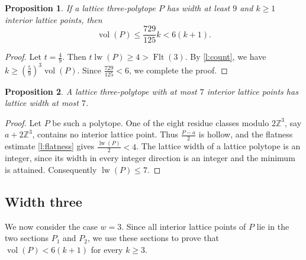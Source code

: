 \documentclass[reqno, 11pt]{article}
\numberwithin{equation}{section}
\newtheorem{proposition}[proposition]{Proposition}
\theoremstyle{definition}
\newcommand{\Z}{\mathbb Z}
\DeclareMathOperator{\vol}{vol}
\DeclareMathOperator{\lw}{lw}
\numberwithin{equation}{section}
\begin{document}
\begin{proposition}\label{l:large}
If a lattice three-polytope $P$ has width at least $9$ and $k\ge1$ interior lattice points, then
\[
 \vol(P)\le\frac{729}{125}k<6(k+1).
\]
\end{proposition}
\begin{proof}
Let $t=\frac{4}{9}$. Then $t\lw(P)\ge4>\operatorname{Flt}(3)$. By \cref{l:count}, we have $k\ge\left(\frac{5}{9}\right)^3\vol(P)$. Since $\frac{729}{125}<6$, we complete the proof.
\end{proof}

\begin{proposition}\label{s:parity}
A lattice three-polytope with at most $7$ interior lattice points has lattice width at most $7$.
\end{proposition}
\begin{proof}
Let \(P\) be such a polytope. One of the eight residue classes modulo $2\Z^3$, say $a+2\Z^3$, contains no interior lattice point. Thus $\frac{P-a}{2}$ is hollow,
and the flatness estimate \eqref{l:flatness} gives $\frac{\lw(P)}{2}<4$.
The lattice width of a lattice polytope is an integer, since its width in every integer direction is an integer and the minimum is
attained. Consequently $\lw(P)\le7$.
\end{proof}

\subsection{Width three}\label{w3:section}

We now consider the case \(w=3\). Since all interior lattice points of \(P\) lie in the two sections \(P_1\) and \(P_2\), we use these sections to prove that \(\operatorname{vol}(P)<6(k+1)\) for every \(k\ge3\).
\end{document}
